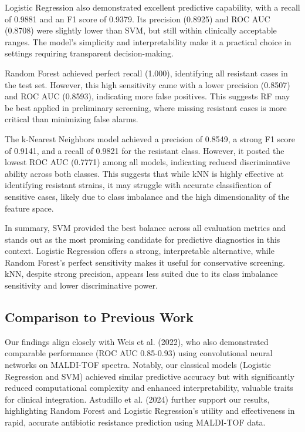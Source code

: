 \documentclass{article}
\begin{document}
Logistic Regression also demonstrated excellent predictive capability, with a recall of 0.9881 and an F1 score of 0.9379. Its precision (0.8925) and ROC AUC (0.8708) were slightly lower than SVM, but still within clinically acceptable ranges. The model's simplicity and interpretability make it a practical choice in settings requiring transparent decision-making.

Random Forest achieved perfect recall (1.000), identifying all resistant cases in the test set. However, this high sensitivity came with a lower precision (0.8507) and ROC AUC (0.8593), indicating more false positives. This suggests RF may be best applied in preliminary screening, where missing resistant cases is more critical than minimizing false alarms.

The k-Nearest Neighbors model achieved a precision of 0.8549, a strong F1 score of 0.9141, and a recall of 0.9821 for the resistant class. However, it posted the lowest ROC AUC (0.7771) among all models, indicating reduced discriminative ability across both classes. This suggests that while kNN is highly effective at identifying resistant strains, it may struggle with accurate classification of sensitive cases, likely due to class imbalance and the high dimensionality of the feature space.


In summary, SVM provided the best balance across all evaluation metrics and stands out as the most promising candidate for predictive diagnostics in this context. Logistic Regression offers a strong, interpretable alternative, while Random Forest's perfect sensitivity makes it useful for conservative screening. kNN, despite strong precision, appears less suited due to its class imbalance sensitivity and lower discriminative power.


\subsection{Comparison to Previous Work}

Our findings align closely with Weis et al. (2022), who also demonstrated comparable performance (ROC AUC 0.85-0.93) using convolutional neural networks on MALDI-TOF spectra. Notably, our classical models (Logistic Regression and SVM) achieved similar predictive accuracy but with significantly reduced computational complexity and enhanced interpretability, valuable traits for clinical integration. Astudillo et al. (2024) further support our results, highlighting Random Forest and Logistic Regression's utility and effectiveness in rapid, accurate antibiotic resistance prediction using MALDI-TOF data.
\end{document}
